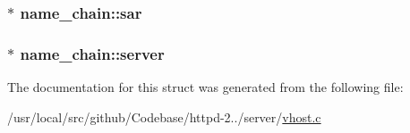 \subsubsection[{\texorpdfstring{sar}{sar}}]{$\ast$ name\+\_\+chain\+::sar}\hypertarget{structname__chain_a4824fc24604babfccffe230d378f415e}{}\label{structname__chain_a4824fc24604babfccffe230d378f415e}
\subsubsection[{\texorpdfstring{server}{server}}]{$\ast$ name\+\_\+chain\+::server}\hypertarget{structname__chain_a4e15bcedc0bf164d6c996eeda9fb6c83}{}\label{structname__chain_a4e15bcedc0bf164d6c996eeda9fb6c83}


The documentation for this struct was generated from the following file\+:\begin{DoxyCompactItemize}
\item 
/usr/local/src/github/\+Codebase/httpd-\/2../server/\hyperlink{vhost_8c}{vhost.\+c}\end{DoxyCompactItemize}
